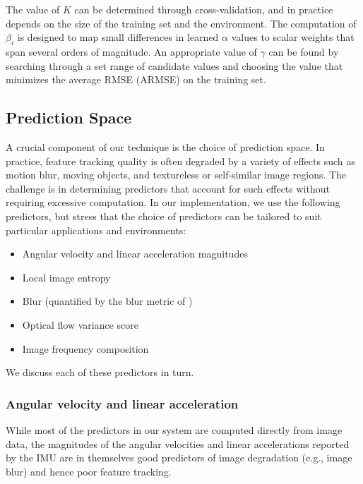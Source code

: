 The value of $K$ can be determined through cross-validation, and in practice depends on the size of the training set and the environment.
The computation of $\beta_i$ is designed to map small differences in learned $\alpha$ values to scalar weights that span several orders of magnitude.
An appropriate value of $\gamma$ can be found by searching through a set range of candidate values and choosing the value that minimizes the average RMSE (ARMSE) on the training set.


\subsection{Prediction Space} \label{sec:predictors}
A crucial component of our technique is the choice of prediction space.
In practice, feature tracking quality is often degraded by a variety of effects such as motion blur, moving objects, and textureless or self-similar image regions.
The challenge is in determining predictors that account for such effects without requiring excessive computation.
In our implementation, we use the following predictors, but stress that the choice of predictors can be tailored to suit particular applications and environments:
\begin{itemize}
    \item Angular velocity and linear acceleration magnitudes
    \item Local image entropy
    \item Blur (quantified by the blur metric of \cite{Anonymous:Ngi3VEEU})
    \item Optical flow variance score
    \item Image frequency composition
\end{itemize}
We discuss each of these predictors in turn.


\subsubsection{Angular velocity and linear acceleration}
While most of the predictors in our system are computed directly from image data, the magnitudes of the angular velocities and linear accelerations reported by the IMU are in themselves good predictors of image degradation (e.g., image blur) and hence poor feature tracking. 

